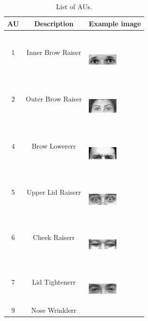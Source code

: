 \documentclass[10pt, conference, compsocconf]{IEEEtran}
\begin{document}
\begin{table}
	\caption{List of AUs.}
	\label{tab:freq}
	\centering
	\begin{tabular}{ccl}
		\toprule
		AU & Description & Example image\\
		\midrule
		1 & Inner Brow Raiser & \ \ \ \begin{minipage} {0.1\textwidth}
			\includegraphics[width=0.6in]{AUimage/AU1.png}
		\end{minipage}\\
		2 & Outer Brow Raiser & \ \ \ \begin{minipage} {0.1\textwidth}
			\includegraphics[width=0.6in]{AUimage/AU2.png}
		\end{minipage}\\
		4 & Brow Lowererr & \ \ \ \begin{minipage} {0.1\textwidth}
			\includegraphics[width=0.6in]{AUimage/AU4.png}
		\end{minipage}\\
		5 & Upper Lid Raiserr & \ \ \ \begin{minipage} {0.1\textwidth}
			\includegraphics[width=0.6in]{AUimage/AU5.png}
		\end{minipage}\\
		6 & Cheek Raiserr & \ \ \ \begin{minipage} {0.1\textwidth}
			\includegraphics[width=0.6in]{AUimage/AU6.png}
		\end{minipage}\\
		7 & Lid Tightenerr & \ \ \ \begin{minipage} {0.1\textwidth}
			\includegraphics[width=0.6in]{AUimage/AU7.png}
		\end{minipage}\\
		9 & Nose Wrinklerr & \ \ \ \begin{minipage} {0.1\textwidth}

\end{minipage}
\end{tabular}
\end{table}
\end{document}
